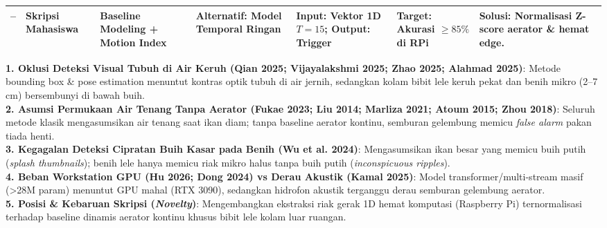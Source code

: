 \documentclass[10pt,a4paper]{article}
\begin{document}
{\begin{longtable}{@{}p{0.4cm} p{2.8cm} p{2.8cm} p{2.6cm} p{2.4cm} p{2.2cm} p{3.2cm}@{}}
\midrule
\textbf{--} & \textbf{Skripsi Mahasiswa} & \textbf{Baseline Modeling + Motion Index} & \textbf{Alternatif: Model Temporal Ringan} & \textbf{Input: Vektor 1D $T=15$; Output: Trigger} & \textbf{Target: Akurasi $\ge 85\%$ di RPi} & \textbf{Solusi: Normalisasi Z-score aerator \& hemat edge.} \\
\bottomrule
\end{longtable}
}

\begin{tcolorbox}[colback=blue!5!white,colframe=blue!75!black,title=\textbf{Sintesis 4 Research Gap Kunci Terhadap Seluruh Literatur Global (20 Artikel)}]
{\scriptsize
\textbf{1. Oklusi Deteksi Visual Tubuh di Air Keruh (Qian 2025; Vijayalakshmi 2025; Zhao 2025; Alahmad 2025)}: Metode bounding box \& pose estimation menuntut kontras optik tubuh di air jernih, sedangkan kolam bibit lele keruh pekat dan benih mikro (2--7 cm) bersembunyi di bawah buih.\\
\textbf{2. Asumsi Permukaan Air Tenang Tanpa Aerator (Fukae 2023; Liu 2014; Marliza 2021; Atoum 2015; Zhou 2018)}: Seluruh metode klasik mengasumsikan air tenang saat ikan diam; tanpa baseline aerator kontinu, semburan gelembung memicu \textit{false alarm} pakan tiada henti.\\
\textbf{3. Kegagalan Deteksi Cipratan Buih Kasar pada Benih (Wu et al. 2024)}: Mengasumsikan ikan besar yang memicu buih putih (\textit{splash thumbnails}); benih lele hanya memicu riak mikro halus tanpa buih putih (\textit{inconspicuous ripples}).\\
\textbf{4. Beban Workstation GPU (Hu 2026; Dong 2024) vs Derau Akustik (Kamal 2025)}: Model transformer/multi-stream masif (>28M param) menuntut GPU mahal (RTX 3090), sedangkan hidrofon akustik terganggu derau semburan gelembung aerator.\\
\textbf{5. Posisi \& Kebaruan Skripsi (\textit{Novelty})}: Mengembangkan ekstraksi riak gerak 1D hemat komputasi (Raspberry Pi) ternormalisasi terhadap baseline dinamis aerator kontinu khusus bibit lele kolam luar ruangan.
}
\end{tcolorbox}

\newpage
\end{document}
